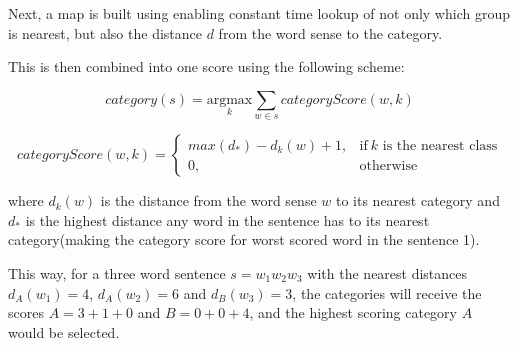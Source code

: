 \documentclass[a4paper,11pt]{kth-mag}
\begin{document}
Next, a map is built using enabling constant time lookup of not only which group is nearest,
but also the distance $d$ from the word sense to the category.

This is then combined into one score using the following scheme:

\begin{equation} \label{eq:heruistic}
  category(s) =
  \underset{k}{\text{argmax}}
  \sum_{w \in s} categoryScore(w, k)
\end{equation}

\begin{equation} \label{eq:heruistic_d}
  categoryScore(w, k) =
  \begin{cases}
    max(d_*) - d_k(w) + 1, & \text{if}\ k \text{ is the nearest class}\\
    0, & \text{otherwise}
  \end{cases}
\end{equation}

where $d_k(w)$ is the distance from the word sense $w$
to its nearest category and $d_*$ is the highest distance any word in the sentence
has to its nearest category(making the category score for worst scored word in the sentence 1).

This way, for a three word sentence $s=w_1w_2w_3$ with the nearest distances
$d_A(w_1)=4$, $d_A(w_2)=6$ and $d_B(w_3)=3$,
the categories will receive the scores $A=3+1+0$ and $B=0+0+4$, and the highest scoring category $A$
would be selected.
\end{document}

